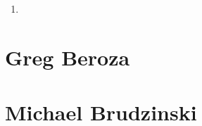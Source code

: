 \documentclass[a4paper, 11pt]{article} %
\begin{document}
\begin{enumerate}
	\item  
\end{enumerate}









\section{Greg Beroza}








\section{Michael Brudzinski}











\end{document}
